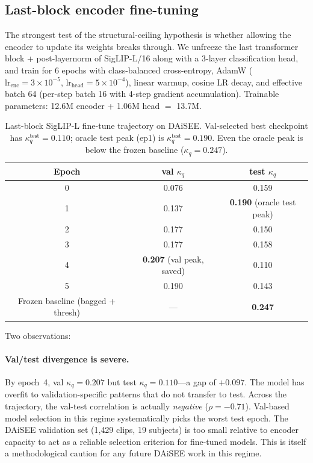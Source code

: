 \subsection{Last-block encoder fine-tuning}
\label{sec:finetune}

The strongest test of the structural-ceiling hypothesis is whether
allowing the encoder to update its weights breaks through.
We unfreeze the last transformer block + post-layernorm of
SigLIP-L/16 along with a 3-layer classification head, and train
for 6 epochs with class-balanced cross-entropy, AdamW
($\mathrm{lr}_{\mathrm{enc}}=3{\times}10^{-5}$,
$\mathrm{lr}_{\mathrm{head}}=5{\times}10^{-4}$), linear warmup,
cosine LR decay, and effective batch 64 (per-step batch 16 with
4-step gradient accumulation). Trainable parameters: 12.6M encoder
+ 1.06M head $=$ 13.7M.

\begin{table}[t]
\caption{Last-block SigLIP-L fine-tune trajectory on DAiSEE.
Val-selected best checkpoint has $\kappa_q^{\mathrm{test}}=0.110$;
oracle test peak (ep1) is $\kappa_q^{\mathrm{test}}=0.190$. Even
the oracle peak is below the frozen baseline ($\kappa_q=0.247$).}
\label{tab:finetune}
\centering
\small
\begin{tabular}{ccc}
\toprule
Epoch & val $\kappa_q$ & test $\kappa_q$ \\
\midrule
0 & 0.076 & 0.159\\
1 & 0.137 & \textbf{0.190} (oracle test peak)\\
2 & 0.177 & 0.150\\
3 & 0.177 & 0.158\\
4 & \textbf{0.207} (val peak, saved) & 0.110\\
5 & 0.190 & 0.143\\
\midrule
Frozen baseline (bagged + thresh) & --- & \textbf{0.247}\\
\bottomrule
\end{tabular}
\end{table}

Two observations:

\paragraph{Val/test divergence is severe.} By epoch~4, val
$\kappa_q = 0.207$ but test $\kappa_q = 0.110$---a gap of $+0.097$.
The model has overfit to validation-specific patterns that do not
transfer to test. Across the trajectory, the val-test correlation
is actually \emph{negative} ($\rho = -0.71$). Val-based model
selection in this regime systematically picks the worst test
epoch. The DAiSEE validation set (1{,}429 clips, 19 subjects) is
too small relative to encoder capacity to act as a reliable
selection criterion for fine-tuned models. This is itself a
methodological caution for any future DAiSEE work in this regime.

